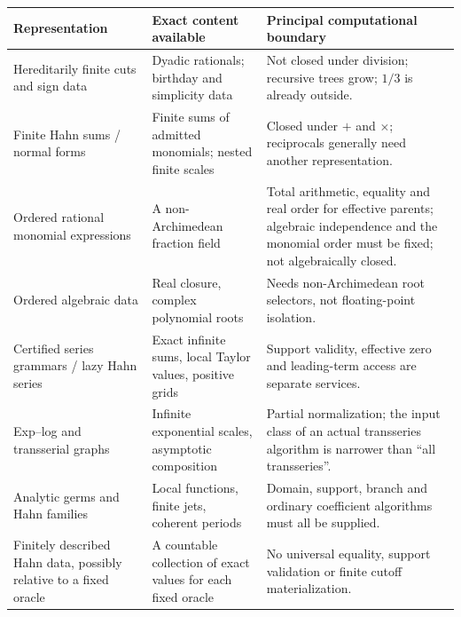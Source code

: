 \documentclass[11pt,letterpaper]{article}
\numberwithin{equation}{section}
\theoremstyle{definition}
\theoremstyle{remark}
\begin{document}
\begingroup\small
\begin{longtable}{@{}L{0.22\textwidth}L{0.34\textwidth}L{0.35\textwidth}@{}}
\toprule
Representation & Exact content available & Principal computational boundary\\
\midrule\endhead
Hereditarily finite cuts and sign data & Dyadic rationals; birthday and
simplicity data & Not closed under division; recursive trees grow; $1/3$ is
already outside.\\[0.4em]
Finite Hahn sums / normal forms & Finite sums of admitted monomials; nested
finite scales & Closed under $+$ and $\times$; reciprocals generally need
another representation.\\[0.4em]
Ordered rational monomial expressions & A non-Archimedean fraction field &
Total arithmetic, equality and real order for effective parents; algebraic
independence and the monomial order must be fixed; not algebraically
closed.\\[0.4em]
Ordered algebraic data & Real closure, complex polynomial roots & Needs
non-Archimedean root selectors, not floating-point isolation.\\[0.4em]
Certified series grammars / lazy Hahn series & Exact infinite sums, local
Taylor values, positive grids & Support validity, effective zero and
leading-term access are separate services.\\[0.4em]
Exp--log and transserial graphs & Infinite exponential scales, asymptotic
composition & Partial normalization; the input class of an actual transseries
algorithm is narrower than ``all transseries''.\\[0.4em]
Analytic germs and Hahn families & Local functions, finite jets, coherent
periods & Domain, support, branch and ordinary coefficient algorithms must all
be supplied.\\[0.4em]
Finitely described Hahn data, possibly relative to a fixed oracle & A countable
collection of exact values for each fixed oracle & No universal equality, support validation or finite cutoff
materialization.\\
\bottomrule
\end{longtable}
\endgroup
\end{document}
